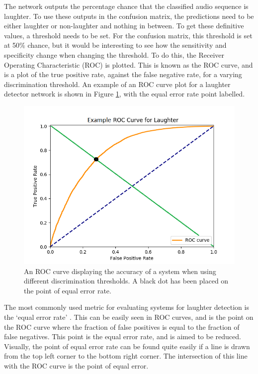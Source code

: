 \documentclass[a4paper,11pt,notitlepage]{article}
\begin{document}
\noindent
The network outputs the percentage chance that the classified audio sequence is laughter. To use these outputs in the confusion matrix, the predictions need to be either laughter or non-laughter and nothing in between. To get these definitive values, a threshold needs to be set. For the confusion matrix, this threshold is set at 50\% chance, but it would be interesting to see how the sensitivity and specificity change when changing the threshold. To do this, the Receiver Operating Characteristic (ROC) is plotted. This is known as the ROC curve, and is a plot of the true positive rate, against the false negative rate, for a varying discrimination threshold. An example of an ROC curve plot for a laughter detector network is shown in Figure \ref{laughter_roc1}, with the equal error rate point labelled.

\begin{figure}[H]
	\centering
	\vspace{0.5cm}
	\includegraphics[scale = 0.7]{figs/laughter_roc.png}
	\caption{An ROC curve displaying the accuracy of a system when using different discrimination thresholds. A black dot has been placed on the point of equal error rate.}
	\label{laughter_roc1}
\end{figure}

\noindent
The most commonly used metric for evaluating systems for laughter detection is the `equal error rate' \cite{reuderink2008decision,kennedy2004laughter,truong2005automatic,knox2007automatic,petridis2008fusion}. This can be easily seen in ROC curves, and is the point on the ROC curve where the fraction of false positives is equal to the fraction of false negatives. This point is the equal error rate, and is aimed to be reduced. Visually, the point of equal error rate can be found quite easily if a line is drawn from the top left corner to the bottom right corner. The intersection of this line with the ROC curve is the point of equal error. 
\end{document}
